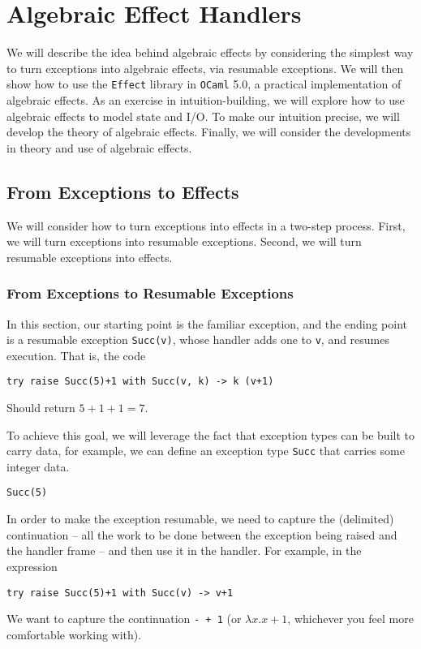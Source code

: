 \section{Algebraic Effect Handlers}

We will describe the idea behind algebraic effects by considering the simplest way to turn exceptions into algebraic effects, via resumable exceptions. We will then show how to use the \texttt{Effect} library in \texttt{OCaml} 5.0, a practical implementation of algebraic effects. As an exercise in intuition-building, we will explore how to use algebraic effects to model state and I/O. To make our intuition precise, we will develop the theory of algebraic effects. Finally, we will consider the developments in theory and use of algebraic effects. 

\subsection{From Exceptions to Effects}
We will consider how to turn exceptions into effects in a two-step process. First, we will turn exceptions into resumable exceptions. Second, we will turn resumable exceptions into effects. 

\subsubsection{From Exceptions to Resumable Exceptions}
In this section, our starting point is the familiar exception, and the ending point is a resumable exception \texttt{Succ(v)}, whose handler adds one to \texttt{v}, and resumes execution. That is, the code
\begin{verbatim}
try raise Succ(5)+1 with Succ(v, k) -> k (v+1)
\end{verbatim}
Should return $5+1+1 = 7$.

To achieve this goal, we will leverage the fact that exception types can be built to carry data, for example, we can define an exception type \texttt{Succ} that carries some integer data.
\begin{verbatim}
Succ(5) 
\end{verbatim}
In order to make the exception resumable, we need to capture the (delimited) continuation -- all the work to be done between the exception being raised and the handler frame -- and then use it in the handler. For example, in the expression
\begin{verbatim}
try raise Succ(5)+1 with Succ(v) -> v+1
\end{verbatim}
We want to capture the continuation \texttt{- + 1} (or $\lambda x. x + 1$, whichever you feel more comfortable working with).

